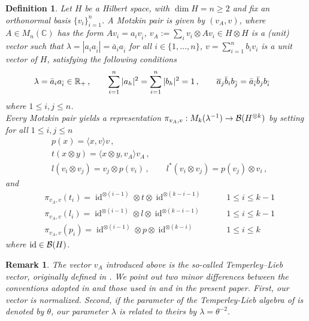 \documentclass[12pt, a4paper]{amsart}
\def\dim{\operatorname{dim}}
\def\id{\operatorname{id}}
\def\id{\operatorname{id}}
\newcommand{\IC}[0]{\mathbb{C}} \newcommand{\ID}[0]{\mathbb{D}}
\newtheorem{definition}[theorem]{Definition}
\newtheorem{remark}[theorem]{Remark}
\numberwithin{equation}{section}
\begin{document}
\begin{definition}\label{Motzkin_pair} \cite{ADR01}
Let $H$ be a Hilbert space, with $\dim H=n\geq 2$ and fix an orthonormal basis $\{v_i\}_{i=1}^n$.
A Motzkin pair is given by $(v_A, v)$, where $A\in M_{n}(\IC)$ has the form $Av_i=a_i v_{\bar i}$, 
 $v_A:=\sum_i v_i\otimes Av_i\in H\otimes H$ is a (unit) vector  
 such that $\lambda = |a_i a_{\bar i}|=\bar{a}_i a_{\bar i}$ for all $i\in \{1, \ldots, n\}$, $v=\sum_{i=1}^n b_iv_i$ is a unit vector of $H$,  
 satisfying the following conditions
\begin{equation*}\label{eqMotzkinPair}
\begin{aligned}
&\lambda = \bar{a}_i a_{\bar i}\in\mathbb{R}_+\, , \qquad
\sum_{i=1}^n |a_h|^2= \sum_{i=1}^n |b_h|^2=1\, , \qquad
  \overline{a }_j \bar b_i  b_{\bar j} =     \bar{a}_{\bar i} \bar b_j b_{\bar i} 
\end{aligned}
\end{equation*}
where $1\leq i, j\leq n$.\\
Every Motzkin pair yields a representation 
 $\pi_{v_{A},v}: M_k(\lambda^{-1})\to \mathcal{B}(H^{\otimes k})$ by setting
for all  $1\leq i, j\leq n$
\begin{equation*}
\begin{aligned}
&p(x)= \langle x,v\rangle v \, ,\\%
&t(x\otimes y)= \langle x\otimes y, v_A \rangle v_A\, ,\\
&l(v_i\otimes v_j)= v_j\otimes p(v_{i})\, , \qquad l^*(v_i\otimes v_j)=  p(v_{j})\otimes v_i\, ,
\end{aligned} 
\end{equation*}
and  
\begin{equation*}
\begin{aligned}
&\pi_{v_A,v}(t_i) = \id^{\otimes (i-1)} \otimes t \otimes \id^{\otimes (k-i-1)} & \qquad 1 \leq i \leq k-1 \\
&\pi_{v_A,v}(l_i) = \id^{\otimes (i-1)} \otimes l \otimes \id^{\otimes (k-i-1)} & \qquad  1 \leq i \leq k-1 \\
&\pi_{v_A,v}(p_i) = \id^{\otimes (i-1)} \otimes p \otimes \id^{\otimes (k-i)}  & \qquad  1 \leq i \leq k
\end{aligned}
\end{equation*}
where $\id\in\CB(H)$.
\end{definition} 
\begin{remark}
 The vector $v_A$ introduced above is the so-called \emph{Temperley--Lieb vector}, originally defined in \cite[Definition~1.2]{Nesh}. We point out two minor differences between the conventions adopted in \cite{Nesh} and those used in \cite{ADR01} and in the present paper. First, our vector is normalized. Second, if the parameter of  the Temperley-Lieb algebra of \cite{Nesh} 
is denoted by $\theta$, our parameter $\lambda$ is related to theirs by
$\lambda=\theta^{-2}$. 
\end{remark}
\end{document}
